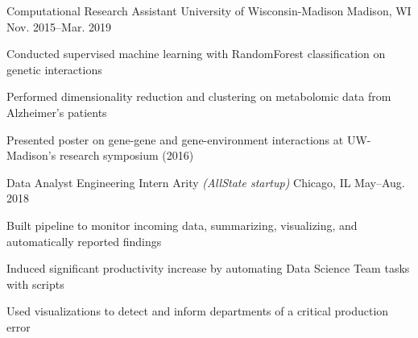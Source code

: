 \documentclass[10pt, letterpaper]{awesome-cv}
\begin{document}
\begin{cventries}
    \cventry
        {Computational Research Assistant}
        {University of Wisconsin-Madison}
        {Madison, WI}
        {Nov. 2015--Mar. 2019}
        {\begin{cvitems} 
            \item Conducted supervised machine learning with RandomForest classification on genetic interactions
            \item Performed dimensionality reduction and clustering on metabolomic data from Alzheimer's patients
            \item Presented poster on gene-gene and gene-environment interactions at UW-Madison's research symposium (2016) 
        \end{cvitems}}
    
        
    \cventry
        {Data Analyst Engineering Intern}
        {Arity \textit{(AllState startup)}}
        {Chicago, IL}
        {May--Aug. 2018}
        {\begin{cvitems} 
            \item Built pipeline to monitor incoming data, summarizing, visualizing, and automatically reported findings
            \item Induced significant productivity increase by automating Data Science Team tasks with scripts
            \item Used visualizations to detect and inform departments of a critical production error
            \end{cvitems}}
            
\end{cventries}
\end{document}

